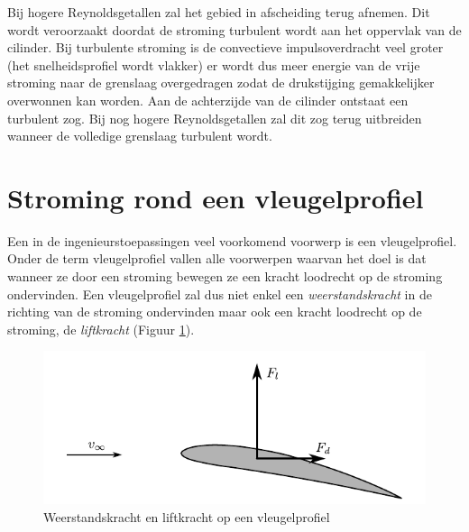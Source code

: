Bij hogere Reynoldsgetallen zal het gebied in afscheiding terug afnemen. Dit wordt veroorzaakt doordat de stroming turbulent wordt aan het oppervlak van de cilinder. Bij turbulente stroming is de convectieve impulsoverdracht veel groter (het snelheidsprofiel wordt vlakker) er wordt dus meer energie van de vrije stroming naar de grenslaag overgedragen zodat de drukstijging gemakkelijker overwonnen kan worden. Aan de achterzijde van de cilinder ontstaat een turbulent zog. Bij nog hogere Reynoldsgetallen zal dit zog terug uitbreiden wanneer de volledige grenslaag turbulent wordt.

	\section{Stroming rond een vleugelprofiel}
	\label{sec:Stroming rond een vleugelprofiel}

Een in de ingenieurstoepassingen veel voorkomend voorwerp is een vleugelprofiel. Onder de term vleugelprofiel vallen alle voorwerpen waarvan het doel is dat wanneer ze door een stroming bewegen ze een kracht loodrecht op de stroming ondervinden. Een vleugelprofiel zal dus niet enkel een \emph{weerstandskracht} in de richting van de stroming ondervinden maar ook een kracht loodrecht op de stroming, de \emph{liftkracht} (Figuur \ref{fig:vleugelprofiel krachten}).
\begin{figure}[htb]
	\centering
	\includegraphics{fig/uitwendige_stroming/vleugelprofiel_krachten}
	\caption{Weerstandskracht en liftkracht op een vleugelprofiel}
	\label{fig:vleugelprofiel krachten}
\end{figure}

